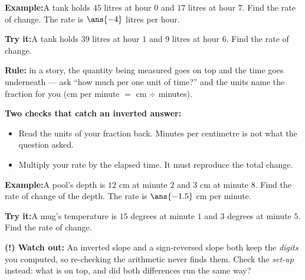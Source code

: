 \documentclass[12pt]{article}
\begin{document}
\begin{examplebox}
\textbf{Example:}\quad A tank holds $45$ litres at hour $0$ and $17$ litres at hour
$7$. Find the rate of change.
The rate is $\ans{-4}$ litres per hour.
\end{examplebox}

\begin{tryitbox}
\textbf{Try it:}\quad A tank holds $39$ litres at hour $1$ and $9$ litres at hour
$6$. Find the rate of change.\\[2pt]
\end{tryitbox}


\begin{formulabox}
\textbf{Rule:} in a story, the quantity being measured goes on top and the time
goes underneath --- ask ``how much per one unit of time?'' and the units name the
fraction for you (cm per minute $=$ cm $\div$ minutes).\par
\smallskip
\textbf{Two checks that catch an inverted answer:}
\begin{itemize}[leftmargin=0.8cm, itemsep=1pt, topsep=2pt]
  \item Read the units of your fraction back. Minutes per centimetre is not what
        the question asked.
  \item Multiply your rate by the elapsed time. It must reproduce the total change.
\end{itemize}
\end{formulabox}

\begin{examplebox}
\textbf{Example:}\quad A pool's depth is $12$ cm at minute $2$ and $3$ cm at
minute $8$. Find the rate of change of the depth.
The rate is $\ans{-1.5}$ cm per minute.
\end{examplebox}

\begin{tryitbox}
\textbf{Try it:}\quad A mug's temperature is $15$ degrees at minute $1$ and $3$
degrees at minute $5$. Find the rate of change.\\[2pt]
\end{tryitbox}

\begin{watchoutbox}
\textbf{(!) Watch out:} An inverted slope and a sign-reversed slope both keep the
\emph{digits} you computed, so re-checking the arithmetic never finds them. Check
the \emph{set-up} instead: what is on top, and did both differences run the same
way?
\end{watchoutbox}
\end{document}
